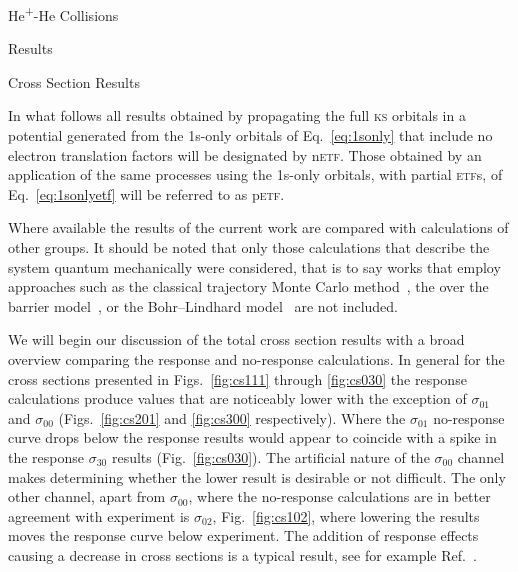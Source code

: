 \documentclass[letterpaper, 11 pt]{report}
\begin{document}
\begin{chapter}{\texorpdfstring{He\textsuperscript{+}}{He+}-He Collisions \label{chap:hephe}}
\begin{section}{Results \label{sec:hephe-disc}}
      \begin{subsection}{Cross Section Results \label{sec:hephe-res}}

         In what follows all results obtained by propagating the full \textsc{ks} orbitals in a
         potential generated from the 1s-only orbitals of Eq.~\eqref{eq:1sonly} that include no electron
         translation factors will be designated by n\textsc{etf}. Those obtained by an application of
         the same processes using the 1s-only orbitals, with partial \textsc{etf}s, of
         Eq.~\eqref{eq:1sonlyetf} will be referred to as p\textsc{etf}.

         Where available the results of the current work are compared with calculations of other groups.
         It should be noted that only those calculations that describe the system quantum mechanically
         were considered, that is to say works that employ approaches such as the classical trajectory
         Monte Carlo method~\cite{GMZ17}, the over the barrier model~\cite{CC-07}, or the Bohr–Lindhard
         model~\cite{DYC-08, DLZ-12} are not included.

         We will begin our discussion of the total cross section results with a broad overview comparing
         the response and no-response calculations. In general for the cross sections presented in
         Figs.~\ref{fig:cs111} through \ref{fig:cs030} the response calculations produce values that are
         noticeably lower with the exception of $\sigma_{01}$ and $\sigma_{00}$ (Figs.~\ref{fig:cs201}
         and \ref{fig:cs300} respectively). Where the $\sigma_{01}$ no-response curve drops below the
         response results would appear to coincide with a spike in the response $\sigma_{30}$ results
         (Fig.~\ref{fig:cs030}). The artificial nature of the $\sigma_{00}$ channel makes determining
         whether the lower result is desirable or not difficult. The only other channel, apart from
         $\sigma_{00}$, where the no-response calculations are in better agreement with experiment is
         $\sigma_{02}$, Fig.~\ref{fig:cs102}, where lowering the results moves the response curve below
         experiment. The addition of response effects causing a decrease in cross sections is a typical
         result, see for example Ref.~\cite{microresp}.


\end{subsection}
\end{section}
\end{chapter}
\end{document}
